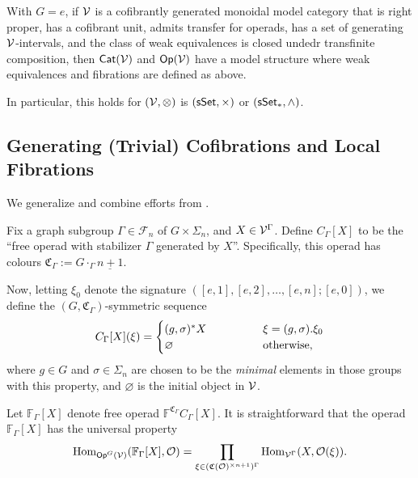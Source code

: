 \documentclass[a4paper,10pt
,draft
]{article}%
\renewcommand{\F}{\mathcal F}
\renewcommand{\1}{\ensuremath{\mathbb{id}}}
\begin{document}
\begin{theorem}
      With $G = e$, if $\mathcal V$ is a
      cofibrantly generated monoidal model category
      that is right proper,
      has a cofibrant unit,
      admits transfer for operads,
      has a set of generating $\mathcal V$-intervals, and
      the class of weak equivalences is closed undedr transfinite composition,
      then
      $\mathsf{Cat}(\mathcal V)$ and $\mathsf{Op}(\mathcal V)$ have a model structure where weak equivalences and fibrations are defined as above.

      In particular, this holds for $(\mathcal V, \otimes)$ is $(\mathsf{sSet}, \times)$ or $(\sSet_{\**}, \wedge)$. 
\end{theorem}


\subsection{Generating (Trivial) Cofibrations and Local Fibrations}

We generalize and combine efforts from \cite{CM13b, BM13, Cav14}.

Fix a graph subgroup $\Gamma \in \F_n$ of $G \times \Sigma_n$, and $X \in \mathcal V^\Gamma$.
Define $C_\Gamma[X]$ to be the ``free operad with stabilizer $\Gamma$ generated by $X$''.
Specifically, this operad has colours $\mathfrak C_\Gamma := G \cdot_\Gamma \underline{n+1}$.

Now, letting $\xi_0$ denote the signature $([e,1],[e,2],\dots,[e,n];[e,0])$,
we define the $(G,\mathfrak C_\Gamma)$-symmetric sequence
\begin{equation}
      C_\Gamma[X](\xi) =
      \begin{cases}
            (g,\sigma)^{\**} X \qquad \qquad & \xi = (g,\sigma).\xi_0
            \\
            \varnothing & \mbox{otherwise,}
      \end{cases}
\end{equation}
where $g \in G$ and $\sigma \in \Sigma_n$ are chosen to be the \textit{minimal} elements in those groups with this property,
and $\varnothing$ is the initial object in $\mathcal V$.

Let $\mathbb F_\Gamma[X]$ denote free operad $\mathbb F^{\mathfrak C_\Gamma} C_\Gamma[X]$.
It is straightforward that the operad $\mathbb F_\Gamma[X]$ has the universal property
\begin{equation}
      \operatorname{Hom}_{\mathsf{Op}^G(\mathcal V)}(\mathbb F_\Gamma[X], \mathcal{O}) = \mathop\prod\limits_{\xi \in (\mathfrak C(\mathcal{O})^{\times n+1})^\Gamma}\operatorname{Hom}_{\mathcal V^\Gamma}(X, \mathcal{O}(\xi)).
\end{equation}
\end{document}
